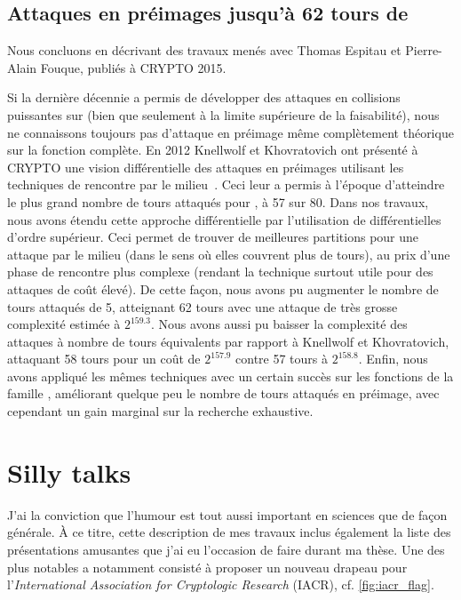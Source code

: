 \subsection{Attaques en préimages jusqu'à 62 tours de \shaone \cite{DBLP:conf/crypto/EspitauFK15}}

Nous concluons en décrivant des travaux menés avec Thomas Espitau et Pierre-Alain Fouque, publiés à CRYPTO 2015.

\medskip

Si la dernière décennie a permis de développer des attaques en collisions puissantes sur \shaone (bien que seulement à la limite supérieure de la faisabilité), nous ne connaissons toujours
pas d'attaque en préimage même complètement théorique sur la fonction complète.
En 2012 Knellwolf et Khovratovich ont présenté à CRYPTO une vision différentielle des attaques en préimages utilisant les techniques de rencontre par le milieu~\cite{DBLP:conf/crypto/KnellwolfK12}.
Ceci leur a permis à l'époque d'atteindre le plus grand nombre de tours attaqués pour \shaone, à 57 sur 80.
Dans nos travaux, nous avons étendu cette approche différentielle par l'utilisation de différentielles d'ordre supérieur. Ceci permet de trouver de meilleures partitions pour une attaque par
le milieu (dans le sens où elles couvrent plus de tours), au prix d'une phase de rencontre plus complexe (rendant la technique surtout utile pour des attaques de coût élevé). De cette façon,
nous avons pu augmenter le nombre de tours attaqués de 5, atteignant 62 tours avec une attaque de très grosse complexité estimée à $2^{159.3}$.
Nous avons aussi pu baisser la complexité des attaques à nombre
de tours équivalents par rapport à Knellwolf et Khovratovich, attaquant 58 tours pour un coût de $2^{157.9}$ contre 57 tours à $2^{158.8}$. Enfin, nous avons appliqué les mêmes
techniques avec un certain succès sur les fonctions de la famille \blake, améliorant quelque peu le nombre de tours attaqués en préimage, avec cependant un gain marginal sur la
recherche exhaustive. 


\section[Divertissements]{Silly talks}

J'ai la conviction que l'humour est tout aussi important en sciences que de façon générale. À ce titre, cette description de mes travaux inclus également la liste des présentations amusantes
que j'ai eu l'occasion de faire durant ma thèse. Une des plus notables a notamment consisté à proposer un nouveau drapeau pour l'\emph{International Association for Cryptologic
Research} (IACR), cf. \autoref{fig:iacr_flag}. 

